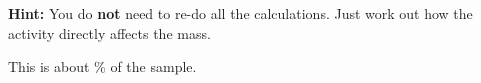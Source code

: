 \documentclass{article}
\begin{document}
{\color{Blue}\textbf{Hint:}} You do \textbf{not} need to re-do all the calculations. Just work out how the activity directly affects the mass.\clearpage


This is about \% of the sample.
\end{document}
